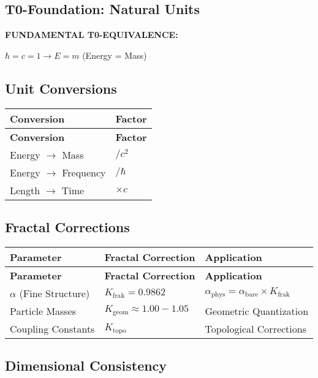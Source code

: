 \documentclass[12pt,a4paper]{article}
\begin{document}
	\subsection{T0-Foundation: Natural Units}
	
	\textbf{FUNDAMENTAL T0-EQUIVALENCE:}
	\begin{center}
		\(\hbar = c = 1 \rightarrow E = m\) (Energy = Mass)
	\end{center}
	
	\subsection{Unit Conversions}
	
	\begin{longtable}{|p{3cm}|p{3cm}|}
		\hline
		\textbf{Conversion} & \textbf{Factor} \\
		\hline
		\endfirsthead
		\hline
		\textbf{Conversion} & \textbf{Factor} \\
		\hline
		\endhead
		Energy \(\rightarrow\) Mass & \(/c^{2}\) \\
		\hline
		Energy \(\rightarrow\) Frequency & \(/\hbar\) \\
		\hline
		Length \(\rightarrow\) Time & \(\times c\) \\
		\hline
	\end{longtable}
	
	\subsection{Fractal Corrections}
	
	\begin{longtable}{|p{4cm}|p{4cm}|p{5cm}|}
		\hline
		\textbf{Parameter} & \textbf{Fractal Correction} & \textbf{Application} \\
		\hline
		\endfirsthead
		\hline
		\textbf{Parameter} & \textbf{Fractal Correction} & \textbf{Application} \\
		\hline
		\endhead
		\(\alpha\) (Fine Structure) & \(K_{\text{frak}} = 0.9862\) & \(\alpha_{\text{phys}} = \alpha_{\text{bare}} \times K_{\text{frak}}\) \\
		\hline
		Particle Masses & \(K_{\text{geom}} \approx 1.00-1.05\) & Geometric Quantization \\
		\hline
		Coupling Constants & \(K_{\text{topo}}\) & Topological Corrections \\
		\hline
	\end{longtable}
	
	\subsection{Dimensional Consistency}
	
\end{document}

